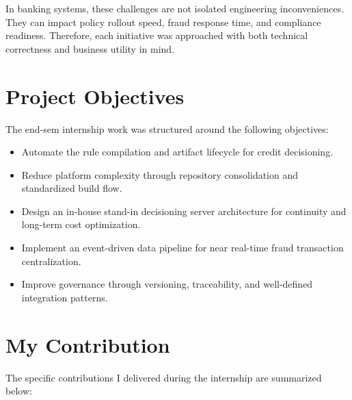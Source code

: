 In banking systems, these challenges are not isolated engineering inconveniences. They can impact policy rollout speed, fraud response time, and compliance readiness. Therefore, each initiative was approached with both technical correctness and business utility in mind.

\section{Project Objectives}

The end-sem internship work was structured around the following objectives:

\begin{itemize}
	\item Automate the rule compilation and artifact lifecycle for credit decisioning.
	\item Reduce platform complexity through repository consolidation and standardized build flow.
	\item Design an in-house stand-in decisioning server architecture for continuity and long-term cost optimization.
	\item Implement an event-driven data pipeline for near real-time fraud transaction centralization.
	\item Improve governance through versioning, traceability, and well-defined integration patterns.
\end{itemize}

\section{My Contribution}

The specific contributions I delivered during the internship are summarized below:

